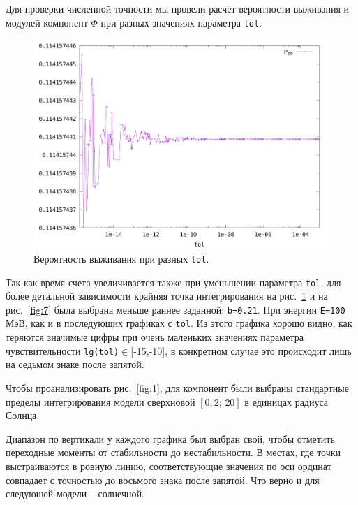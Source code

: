 \documentclass[12pt]{article}
\begin{document}
Для проверки численной точности мы провели расчёт вероятности выживания и
модулей компонент \(\Phi\) при разных значениях параметра \verb|tol|. 

\begin{figure}[H]
  \hspace{0.5cm}
  \includegraphics[scale=0.51]{sn_Pee}
  \caption{\label{fig:2}Вероятность выживания при разных \texttt{tol}.}
\end{figure}

Так как время счета увеличивается также при уменьшении параметра \verb|tol|, для более детальной зависимости крайняя точка интегрирования на рис.~\ref{fig:2} и на рис.~\ref{fig:7} была выбрана меньше раннее заданной: \verb|b=0.21|. При энергии \verb|E=100| МэВ, как и в последующих графиках с \verb|tol|. Из этого графика хорошо видно, как теряются значимые цифры при очень маленьких значениях параметра чувствительности \verb|lg(tol)|$\in$[-15,-10], в конкретном случае это происходит лишь на седьмом знаке после запятой.

Чтобы проанализировать рис.~\ref{fig:1}, для компонент были выбраны стандартные пределы интегрирования модели сверхновой $[0,2;\,20]$ в единицах радиуса Солнца.

Диапазон по вертикали у каждого графика был выбран свой, чтобы отметить переходные моменты от стабильности до нестабильности. В местах, где точки выстраиваются в ровную линию, соответствующие значения по оси ординат совпадает с точностью до восьмого знака после запятой. Что верно и для следующей модели -- солнечной.
\end{document}
